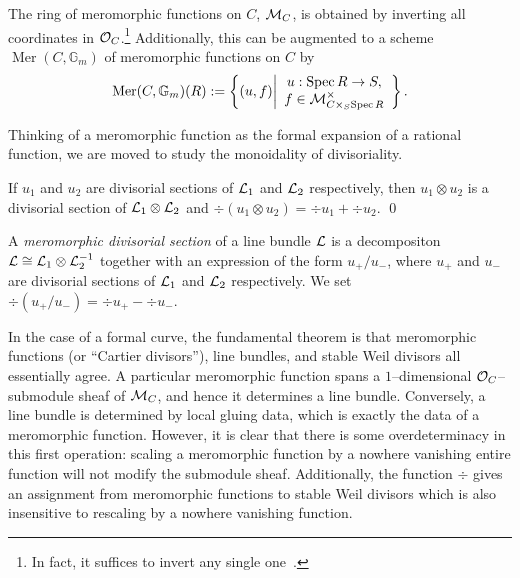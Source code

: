 \begin{definition}
The ring of meromorphic functions on $C$, $\mathcal{M}_C$, is obtained by inverting all coordinates in $\mathcal{O}_C$.\footnote{In fact, it suffices to invert any single one~\cite[Lemma 5.21]{StricklandFSFG}.}  Additionally, this can be augmented to a scheme $\operatorname{Mer}(C, \mathbb G_m)$ of meromorphic functions on $C$ by \[\operatorname{Mer}(C, \mathbb G_m)(R) := \left\{ (u, f) \middle| \begin{array}{c} u: \operatorname{Spec} R \to S, \\ f \in \mathcal{M}^\times_{C \times_S \operatorname{Spec} R} \end{array} \right\}.\]
\end{definition}

Thinking of a meromorphic function as the formal expansion of a rational function, we are moved to study the monoidality of divisoriality.

\begin{lemma}
If $u_1$ and $u_2$ are divisorial sections of $\mathcal{L}_1$ and $\mathcal{L}_2$ respectively, then $u_1 \otimes u_2$ is a divisorial section of $\mathcal{L}_1 \otimes \mathcal{L}_2$ and $\div(u_1 \otimes u_2) = \div u_1 + \div u_2$. \qed
\end{lemma}

\begin{definition}
A \textit{meromorphic divisorial section} of a line bundle $\mathcal{L}$ is a decompositon $\mathcal{L} \cong \mathcal{L}_1 \otimes \mathcal{L}_2^{-1}$ together with an expression of the form $u_+ / u_-$, where $u_+$ and $u_-$ are divisorial sections of $\mathcal{L}_1$ and $\mathcal{L}_2$ respectively.  We set $\div(u_+ / u_-) = \div u_+ - \div u_-$.
\end{definition}

In the case of a formal curve, the fundamental theorem is that meromorphic functions (or ``Cartier divisors''), line bundles, and stable Weil divisors all essentially agree.    A particular meromorphic function spans a $1$--dimensional $\mathcal{O}_C$--submodule sheaf of $\mathcal{M}_C$, and hence it determines a line bundle.  Conversely, a line bundle is determined by local gluing data, which is exactly the data of a meromorphic function.  However, it is clear that there is some overdeterminacy in this first operation: scaling a meromorphic function by a nowhere vanishing entire function will not modify the submodule sheaf.  Additionally, the function $\div$ gives an assignment from meromorphic functions to stable Weil divisors which is also insensitive to rescaling by a nowhere vanishing function.

